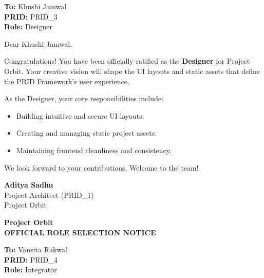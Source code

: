 \documentclass[11pt,a4paper]{article}
\begin{document}
\vspace{10mm}

\noindent \textbf{To:} Khushi Jamwal \\
\textbf{PRID:} PRID\_3 \\
\textbf{Role:} Designer

\vspace{10mm}

\noindent Dear Khushi Jamwal,

\vspace{5mm}

\noindent Congratulations! You have been officially ratified as the \textbf{Designer} for Project Orbit. Your creative vision will shape the UI layouts and static assets that define the PRID Framework's user experience.

\vspace{5mm}

\noindent As the Designer, your core responsibilities include:
\begin{itemize}
    \item Building intuitive and secure UI layouts.
    \item Creating and managing static project assets.
    \item Maintaining frontend cleanliness and consistency.
\end{itemize}

\vspace{10mm}

\noindent We look forward to your contributions. Welcome to the team!

\vspace{15mm}

\begin{flushright}
    \textbf{Aditya Sadhu} \\
    Project Architect (PRID\_1) \\
    Project Orbit
\end{flushright}

\newpage

\begin{center}
    \color{orbitblue}
    {\huge \textbf{Project Orbit}} \\
    \vspace{5mm}
    {\large \textbf{OFFICIAL ROLE SELECTION NOTICE}}
\end{center}

\vspace{10mm}

\noindent \textbf{To:} Vansita Rakwal \\
\textbf{PRID:} PRID\_4 \\
\textbf{Role:} Integrator
\end{document}
